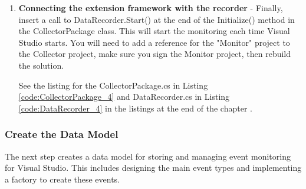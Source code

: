 \begin{enumerate}
\item {\bf Connecting the extension framework with the recorder} -
Finally, insert a call to DataRecorder.Start() at the end of the Initialize() method in the CollectorPackage class.  This will start the monitoring each time Visual Studio starts.  You will need to add a reference for the "Monitor" project to the Collector project, make sure you sign the Monitor project, then rebuild the solution.  

See the listing for the CollectorPackage.cs in Listing \ref{code:CollectorPackage_4} and DataRecorder.cs in Listing \ref{code:DataRecorder_4} in the listings at the end of the chapter .


\end{enumerate}

\subsubsection{Create the Data Model}

The next step creates a data model for storing and managing event monitoring for Visual Studio. This includes designing the main event types and implementing a factory to create these events. 



